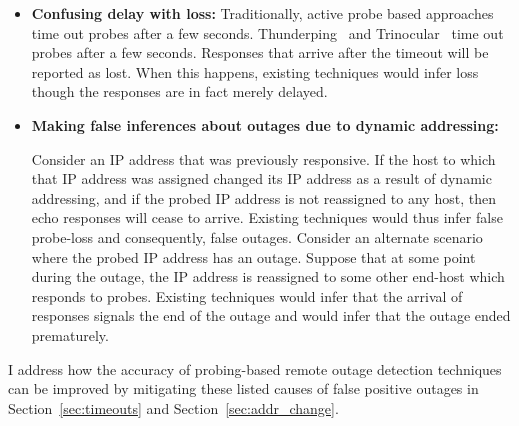 \begin{itemize}

\item{\bf{Confusing delay with loss:}}
 Traditionally, active probe based approaches time out probes after a few seconds. Thunderping~\cite{pingin} and Trinocular~\cite{trinocular}
time out probes after a few seconds. Responses that arrive after the
timeout will be reported as lost. When this happens, existing
techniques would infer loss though the responses are in fact merely
delayed. 


\item{\bf{Making false inferences about outages due to dynamic
      addressing:}}

    Consider an IP address that was previously responsive. If the host
    to which that IP address was assigned changed its IP address as a
    result of dynamic addressing, and if the probed IP
    address is not reassigned to any host, then echo responses will
    cease to arrive. Existing techniques would thus infer false
    probe-loss and consequently, false
    outages. Consider an alternate scenario where the probed IP address has an
    outage. Suppose that at some point during the outage, the IP
    address is reassigned to some other end-host which responds to
    probes. Existing techniques would infer that the arrival of
    responses signals the end of the outage and would infer that the
    outage ended prematurely.


\end{itemize}

I address how the accuracy of probing-based remote outage detection
techniques can be improved by mitigating these listed causes of false
positive outages in Section~\ref{sec:timeouts} and Section~\ref{sec:addr_change}.

